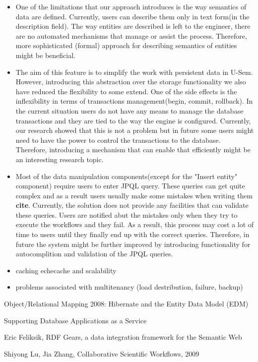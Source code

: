 \documentclass[a4paper, notitlepage]{article}
\begin{document}
\begin{itemize}
\item One of the limitations that our approach introduces is the way semantics of data are defined. Currently, users can describe them only in text form(in the description field). The way entities are described is left to the engineer, there are no automated mechanisms that manage or assist the process. Therefore, more sophisticated (formal) approach for describing semantics of entities might be beneficial.

\item The aim of this feature is to simplify the work with persistent data in U-Sem. However, introducing this abstraction over the storage functionality we also have reduced the flexibility to some extend. One of the side effects is the inflexibility in terms of transactions management(begin, commit, rollback). In the current situation users do not have any means to manage the database transactions and they are tied to the way the engine is configured. Currently, our research showed that this is not a problem but in future some users might need to have the power to control the transactions to the database. Therefore, introducing a mechanism that can enable that efficiently might be an interesting research topic.

\item Most of the data manipulation components(except for the "Insert entity" component) require users to enter JPQL query. These queries can get quite complex and as a result users usually make some mistakes when writing them \textbf{cite}. Currently, the solution does not provide any facilities that can validate these queries. Users are notified abut the mistakes only when they try to execute the workflows and they fail. As a result, this process may cost a lot of time to users until they finally end up with the correct queries. Therefore, in future the system might be further improved by introducing functionality for autocomplition and validation of the JPQL queries.

\item caching echecache and scalability

\item problems associated with multitenancy (load destribution, failure, backup)

\end{itemize}

\begin{thebibliography}{99}

 Object/Relational Mapping 2008: Hibernate and the Entity Data Model (EDM)

 Supporting Database Applications as a Service

 Eric Feliksik, RDF Gears, a data integration framework for the Semantic Web

 Shiyong Lu, Jia Zhang, Collaborative Scientific Workflows, 2009

\end{thebibliography}
\end{document}
